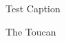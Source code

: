 \documentclass[10pt]{article}
\begin{document}
	\lipsum[1]

	\begin{figure}[!ht]
		\centering
		
		\caption{Test Caption}
	\end{figure} 
	
	
	\lipsum[1]
	\begin{wrapfigure}{r}{40mm}
		\begin{center}
		\end{center}
		\caption{The Toucan}
	\end{wrapfigure}
	\lipsum[2]
\end{document}
